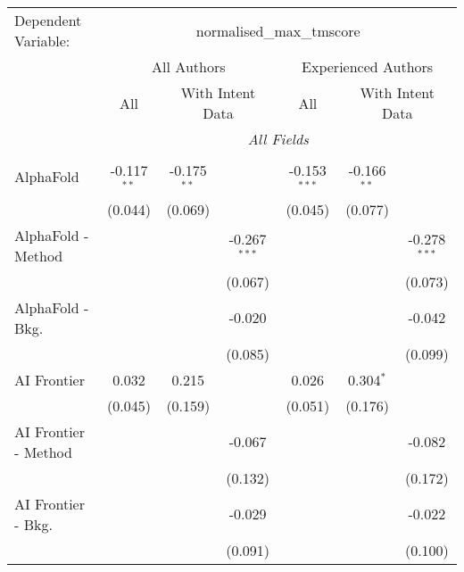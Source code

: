 \begingroup
\centering
\begin{tabular}{lcccccc}
   \tabularnewline \midrule \midrule
   Dependent Variable: & \multicolumn{6}{c}{normalised\_max\_tmscore}\\
 & \multicolumn{3}{c}{All Authors} & \multicolumn{3}{c}{Experienced Authors} \\
\cmidrule(lr){2-4} \cmidrule(lr){5-7}
 & \multicolumn{1}{c}{All} & \multicolumn{2}{c}{With Intent Data} & \multicolumn{1}{c}{All} & \multicolumn{2}{c}{With Intent Data} \\
\cmidrule(lr){2-2} \cmidrule(lr){3-4} \cmidrule(lr){5-5} \cmidrule(lr){6-7}
 & \multicolumn{6}{c}{\textit{All Fields}} \\ \\
   AlphaFold            & -0.117$^{**}$ & -0.175$^{**}$ &                & -0.153$^{***}$ & -0.166$^{**}$ &   \\   
                        & (0.044)       & (0.069)       &                & (0.045)        & (0.077)       &   \\   
   AlphaFold - Method   &               &               & -0.267$^{***}$ &                &               & -0.278$^{***}$\\   
                        &               &               & (0.067)        &                &               & (0.073)\\   
   AlphaFold - Bkg.     &               &               & -0.020         &                &               & -0.042\\   
                        &               &               & (0.085)        &                &               & (0.099)\\   
   AI Frontier          & 0.032         & 0.215         &                & 0.026          & 0.304$^{*}$   &   \\   
                        & (0.045)       & (0.159)       &                & (0.051)        & (0.176)       &   \\   
   AI Frontier - Method &               &               & -0.067         &                &               & -0.082\\   
                        &               &               & (0.132)        &                &               & (0.172)\\   
   AI Frontier - Bkg.   &               &               & -0.029         &                &               & -0.022\\   
                        &               &               & (0.091)        &                &               & (0.100)\\   

\end{tabular}
